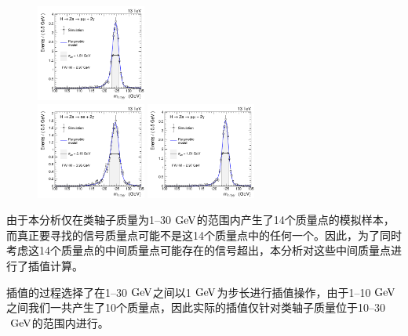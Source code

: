 \begin{figure}[htbp]
\begin{center}
		\includegraphics[width=0.32\textwidth,page=3]{figures/chapter04/sig_model/sigModel_M30_mu.pdf}\\
		\includegraphics[width=0.32\textwidth,page=4]{figures/chapter04/sig_model/sigModel_M30_ele.pdf}
		\includegraphics[width=0.32\textwidth,page=4]{figures/chapter04/sig_model/sigModel_M30_mu.pdf}\\
    \label{fig:sig_fit2}
\end{center}
\end{figure}

由于本分析仅在类轴子质量为1--30$\GeV$的范围内产生了14个质量点的模拟样本，而真正要寻找的信号质量点可能不是这14个质量点中的任何一个。因此，为了同时考虑这14个质量点的中间质量点可能存在的信号超出，本分析对这些中间质量点进行了插值计算。

插值的过程选择了在1--30$\GeV$之间以1$\GeV$为步长进行插值操作，由于1--10$\GeV$之间我们一共产生了10个质量点，因此实际的插值仅针对类轴子质量位于10--30$\GeV$的范围内进行。

